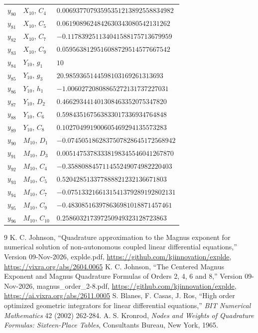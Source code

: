\documentclass[12pt]{article}
\begin{document}
\begin{table}[H]
\begin{tabular}{lll}
$y_{80}$ & $X_{10}$, $C_{4}$ & $0.00693770793595351213892558834982$ \\
$y_{81}$ & $X_{10}$, $C_{5}$ & $0.0619089624842630343080542131262$ \\
$y_{82}$ & $X_{10}$, $C_{7}$ & $-0.117839251134041588175713679959$ \\
$y_{83}$ & $X_{10}$, $C_{9}$ & $0.0595638129516088729514577667542$ \\
$y_{84}$ & $Y_{10}$, $g_{1}$ & $10$ \\
$y_{85}$ & $Y_{10}$, $g_{3}$ & $20.9859365144598103169261313693$ \\
$y_{86}$ & $Y_{10}$, $h_{1}$ & $-1.00602720808865272131737227031$ \\
$y_{87}$ & $Y_{10}$, $D_{2}$ & $0.466293441401308463352075347820$ \\
$y_{88}$ & $Y_{10}$, $C_{6}$ & $0.598435167563833017336934764848$ \\
$y_{89}$ & $Y_{10}$, $C_{8}$ & $0.102704991900605469294135573283$ \\
$y_{90}$ & $M_{10}$, $D_{1}$ & $-0.0745051862837507828645172568942$ \\
$y_{91}$ & $M_{10}$, $D_{3}$ & $0.00514753783338198345546041267870$ \\
$y_{92}$ & $M_{10}$, $C_{4}$ & $-0.358808845711455249074982220403$ \\
$y_{93}$ & $M_{10}$, $C_{5}$ & $0.520428513377888821232136671803$ \\
$y_{94}$ & $M_{10}$, $C_{7}$ & $-0.0751332166131541379289192802131$ \\
$y_{95}$ & $M_{10}$, $C_{9}$ & $-0.483085163978636981018871457461$ \\
$y_{96}$ & $M_{10}$, $C_{10}$ & $0.258603217397250949323128723863$ \\ \hline
\end{tabular}
\end{table}

\begin{thebibliography}{9}
 K. C. Johnson, ``Quadrature approximation to the Magnus exponent for numerical solution of non-autonomous coupled linear differential equations,'' Version 09-Nov-2026, explde.pdf, \url{https://github.com/kjinnovation/explde}, \url{https://vixra.org/abs/2604.0065}
 K. C. Johnson, ``The Centered Magnus Exponent and Magnus Quadrature Formulas of Orders 2, 4, 6 and 8,'' Version 09-Nov-2026, magnus\_order\_2-8.pdf, \url{https://github.com/kjinnovation/explde}, \url{https://ai.vixra.org/abs/2611.0005}
 S. Blanes, F. Casas, J. Ros, ``High order optimized geometric integrators for linear differential equations,'' \emph{BIT Numerical Mathematics} 42 (2002) 262-284.
 A. S. Kronrod, \emph{Nodes and Weights of Quadrature Formulas: Sixteen-Place Tables}, Consultants Bureau, New York, 1965.
\end{thebibliography}
\end{document}
